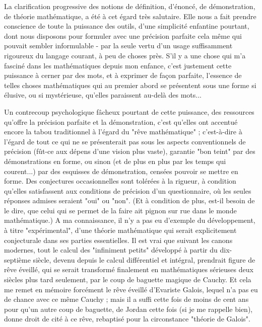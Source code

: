 La clarification progressive des notions de définition, d'énoncé, de démonstration, de théorie mathématique, a été à cet égard très salutaire. Elle nous a fait prendre conscience de toute la puissance des outils, d'une simplicité enfantine pourtant, dont nous disposons pour formuler avec une précision parfaite cela même qui pouvait sembler informulable - par la seule vertu d'un usage suffisamment rigoureux du langage courant, à peu de choses près. S'il y a une chose qui m'a fasciné dans les mathématiques depuis mon enfance, c'est justement cette puissance à cerner par des mots, et à exprimer de façon parfaite, l'essence de telles choses mathématiques qui au premier abord se présentent sous une forme si élusive, ou si mystérieuse, qu'elles paraissent au-delà des mots...

Un contrecoup psychologique fâcheux pourtant de cette puissance, des ressources qu'offre la précision parfaite et la démonstration, c'est qu'elles ont accentué encore la tabou traditionnel à l'égard du "rêve mathématique" ; c'est-à-dire à l'égard de tout ce qui ne se présenterait pas sous les aspects conventionnels de précision (fût-ce aux dépens d'une vision plus vaste), garantie "bon teint" par des démonstrations en forme, ou sinon (et de plus en plus par les temps qui courent...) par des esquisses de démonstration, censées pouvoir se mettre en forme. Des conjectures occasionnelles sont tolérées à la rigueur, à condition qu'elles satisfassent aux conditions de précision d'un questionnaire, où les seules réponses admises seraient "oui" ou "non". (Et à condition de plus, est-il besoin de le dire, que celui qui se permet de la faire ait pignon sur rue dans le monde mathématique.) A ma connaissance, il n'y a pas eu d'exemple du développement, à titre "expérimental", d'une théorie mathématique qui serait explicitement conjecturale dans ses parties essentielles. Il est vrai que suivant les canons modernes, tout le calcul des "infiniment petits" développé à partir du dix-septième siècle, devenu depuis le calcul différentiel et intégral, prendrait figure de rêve éveillé, qui se serait transformé finalement en mathématiques sérieuses deux siècles plus tard seulement, par le coup de baguette magique de Cauchy. Et cela me remet en mémoire forcément le rêve éveillé d'Evariste Galois, lequel n'a pas eu de chance avec ce même Cauchy ; mais il a suffi cette fois de moins de cent ans pour qu'un autre coup de baguette, de Jordan cette fois (si je me rappelle bien), donne droit de cité à ce rêve, rebaptisé pour la circonstance "théorie de Galois".

